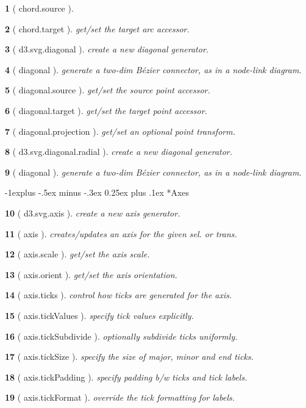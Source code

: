 \documentclass[10pt,landscape,letterpaper]{article}
\makeatletter
\newcounter{thm}
\newcommand{\hdrule}{\vspace{-4pt} \hdashrule[0.25ex]{\fill}{.5pt}{1pt}\vspace{-4pt}}
\theoremstyle{mytheoremstyle}
\newtheorem*{thm}{}
\renewcommand{\subsection}{\@startsection{subsection}{2}{0mm}%
                                {-1explus -.5ex minus -.3ex}%
                                {0.25ex plus .1ex}%
                                {\normalfont\normalsize\bfseries}}
\makeatother
\begin{document}
\begin{multicols}{3}
\begin{thm} [ chord.source ]
\end{thm}\begin{thm} [ chord.target ]  get/set the target arc accessor.
\end{thm}\begin{thm} [ d3.svg.diagonal ]  create a new diagonal generator.
\end{thm}\begin{thm} [ diagonal ]  generate a two-dim Bézier connector, as in a node-link diagram.
\end{thm}\begin{thm} [ diagonal.source ]  get/set the source point accessor.
\end{thm}\begin{thm} [ diagonal.target ]  get/set the target point accessor.
\end{thm}\begin{thm} [ diagonal.projection ]  get/set an optional point transform.
\end{thm}\begin{thm} [ d3.svg.diagonal.radial ]  create a new diagonal generator.
\end{thm}\begin{thm} [ diagonal ]  generate a two-dim Bézier connector, as in a node-link diagram.
\end{thm}
\hdrule
\subsection*{Axes}

\begin{thm} [ d3.svg.axis ]  create a new axis generator.
\end{thm}\begin{thm} [ axis ]  creates/updates an axis for the given sel. or trans.
\end{thm}\begin{thm} [ axis.scale ]  get/set the axis scale.
\end{thm}\begin{thm} [ axis.orient ]  get/set the axis orientation.
\end{thm}\begin{thm} [ axis.ticks ]  control how ticks are generated for the axis.
\end{thm}\begin{thm} [ axis.tickValues ]  specify tick values explicitly.
\end{thm}\begin{thm} [ axis.tickSubdivide ]  optionally subdivide ticks uniformly.
\end{thm}\begin{thm} [ axis.tickSize ]  specify the size of major, minor and end ticks.
\end{thm}\begin{thm} [ axis.tickPadding ]  specify padding b/w ticks and tick labels.
\end{thm}\begin{thm} [ axis.tickFormat ]  override the tick formatting for labels.\end{thm}
\hdrule

\end{multicols}
\end{document}
